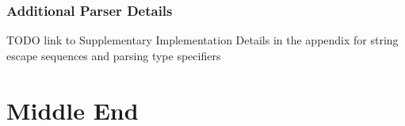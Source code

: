 \documentclass[00-main.tex]{subfiles}
\begin{document}
%

%

\subsubsection{Additional Parser Details}

\begin{mrwComment}
TODO link to Supplementary Implementation Details in the appendix for string escape sequences and parsing type specifiers
\end{mrwComment}


\section{Middle End}\label{sec:impl:middle end}
\end{document}
